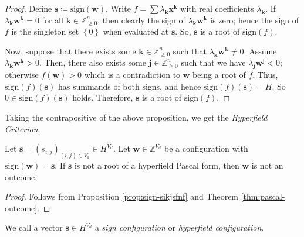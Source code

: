 \begin{proof}
    Define \( \mathbf{s} \coloneqq \mathrm{sign}(\mathbf{w}) \). Write \( f = \sum \lambda_{\mathbf{k}} \mathbf{x}^{\mathbf{k}} \) with real coefficients \( \lambda_{\mathbf{k}} \). If \( \lambda_{\mathbf{k}} \mathbf{w}^{\mathbf{k}} = 0 \) for all \( \mathbf{k} \in \mathbb{Z}^n_{\geq 0} \), then clearly the sign of \( \lambda_{\mathbf{k}} \mathbf{w}^{\mathbf{k}} \) is zero; hence the sign of \( f \) is the singleton set \( \left\{ 0 \right\} \) when evaluated at \( \mathbf{s} \). So, \( \mathbf{s} \) is a root of \( \mathrm{sign}(f) \).

    Now, suppose that there exists some \( \mathbf{k} \in \mathbb{Z}^n_{\geq 0} \) such that \( \lambda_{\mathbf{k}} \mathbf{w}^{\mathbf{k}} \neq 0 \). Assume \(  \lambda_{\mathbf{k}} \mathbf{w}^{\mathbf{k}} > 0 \). Then, there also exists some \( \mathbf{j} \in \mathbb{Z}^n_{\geq 0} \) such that we have \( \lambda_{\mathbf{j}} \mathbf{w}^{\mathbf{j}} < 0 \); otherwise \( f(\mathbf{w}) > 0 \) which is a contradiction to \( \mathbf{w} \) being a root of \( f \). Thus, \( \mathrm{sign}(f)(\mathbf{s}) \) has summands of both signs, and hence \( \mathrm{sign}(f)(\mathbf{s}) = H \). So \( 0 \in  \mathrm{sign}(f)(\mathbf{s}) \) holds. Therefore, \( \mathbf{s} \) is a root of \( \mathrm{sign}(f) \).
\end{proof}

Taking the contrapositive of the above proposition, we get the \emph{Hyperfield Criterion}.

\begin{proposition}\label{prop:hyperfield-criterion}
    Let \( \mathbf{s} = (s_{i,j})_{(i,j) \in V_d} \in H^{V_d} \). Let \( \mathbf{w} \in \mathbb{Z}^{V_d} \) be a configuration with \( \mathrm{sign}(\mathbf{w}) = \mathbf{s} \). If \( \mathbf{s} \) is not a root of a hyperfield Pascal form, then \( \mathbf{w} \) is not an outcome.
\end{proposition}

\begin{proof}
    Follows from Proposition \ref{prop:sign-sikjsfnf} and Theorem \ref{thm:pascal-outcome}.
\end{proof}

We call a vector \( \mathbf{s} \in H^{V_d} \) a \emph{sign configuration} or \emph{hyperfield configuration}. 

